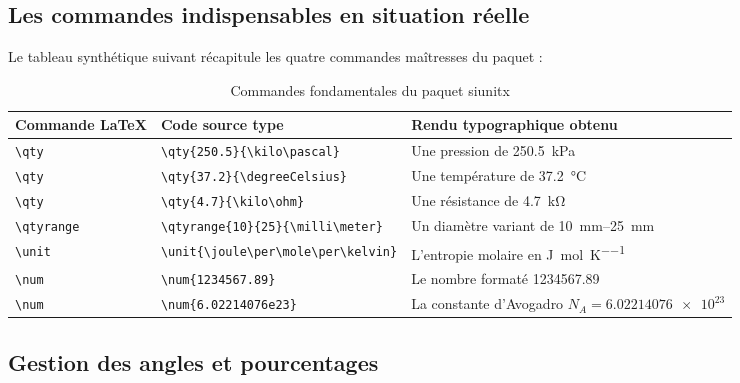 \subsection{Les commandes indispensables en situation réelle}
\label{subsec:commandes_siunitx}

Le tableau synthétique suivant récapitule les quatre commandes maîtresses du paquet :

\begin{table}[htbp]
  \centering
  \small
  \caption{Commandes fondamentales du paquet \textsf{siunitx}}
  \label{tab:commandes_siunitx}
  \begin{tabularx}{\textwidth}{L{2.6cm} L{6.2cm} Y}
    \toprule
    \textbf{Commande \LaTeX{}} & \textbf{Code source type} & \textbf{Rendu typographique obtenu} \\
    \midrule
    \texttt{\textbackslash qty} & \texttt{\textbackslash qty\{250.5\}\{\textbackslash kilo\textbackslash pascal\}} & Une pression de \qty{250.5}{\kilo\pascal} \\
    \texttt{\textbackslash qty} & \texttt{\textbackslash qty\{37.2\}\{\textbackslash degreeCelsius\}} & Une température de \qty{37.2}{\degreeCelsius} \\
    \texttt{\textbackslash qty} & \texttt{\textbackslash qty\{4.7\}\{\textbackslash kilo\textbackslash ohm\}} & Une résistance de \qty{4.7}{\kilo\ohm} \\
    \texttt{\textbackslash qtyrange} & \texttt{\textbackslash qtyrange\{10\}\{25\}\{\textbackslash milli\textbackslash meter\}} & Un diamètre variant de \qtyrange{10}{25}{\milli\meter} \\
    \texttt{\textbackslash unit} & \texttt{\textbackslash unit\{\textbackslash joule\textbackslash per\textbackslash mole\textbackslash per\textbackslash kelvin\}} & L'entropie molaire en \unit{\joule\per\mole\per\kelvin} \\
    \texttt{\textbackslash num} & \texttt{\textbackslash num\{1234567.89\}} & Le nombre formaté \num{1234567.89} \\
    \texttt{\textbackslash num} & \texttt{\textbackslash num\{6.02214076e23\}} & La constante d'Avogadro $N_A = \num{6.02214076e23}$ \\
    \bottomrule
  \end{tabularx}
\end{table}

\subsection{Gestion des angles et pourcentages}
\label{subsec:angles_pourcentages}

